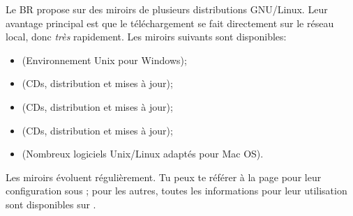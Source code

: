 Le BR propose sur  des miroirs de plusieurs distributions GNU/Linux. Leur avantage principal est que le téléchargement se fait directement sur le réseau local, donc \emph{très} rapidement.
Les miroirs suivants sont disponibles:

\begin{itemize}
\item {} (Environnement Unix pour Windows);
\item {} (CDs, distribution et mises à jour);
\item {} (CDs, distribution et mises à jour);
\item {} (CDs, distribution et mises à jour);
\item {} (Nombreux logiciels Unix/Linux adaptés pour Mac OS).
\end{itemize}

Les miroirs évoluent régulièrement. Tu peux te référer \`a la page \pageref{ubuntu_mirror} pour leur configuration sous  ;
pour les autres, toutes les informations pour leur utilisation sont disponibles sur .

